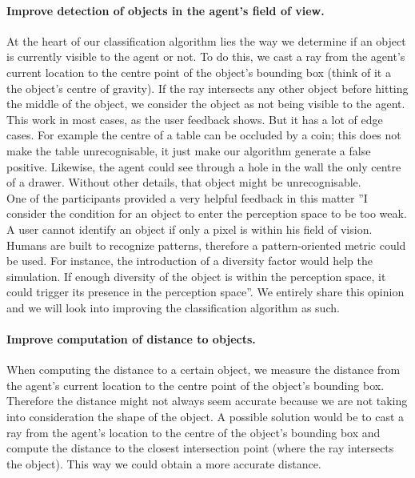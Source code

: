 \paragraph{Improve detection of objects in the agent's field of view.} At the heart of our classification algorithm lies the way we determine if an object is currently visible to the agent or not. To do this, we cast
a ray from the agent's current location to the centre point of the object's bounding box (think of it a the object's centre of gravity). If the ray intersects any other object before hitting the middle of the object,
we consider the object as not being visible to the agent. This work in most cases, as the user feedback shows. But it has a lot of edge cases. For example the centre of a table can be occluded by a coin; this does not make the table unrecognisable, it just make our algorithm generate a false positive. Likewise, the agent could see through a hole in the wall the only centre of a drawer. Without other details, that object
might be unrecognisable.\\

One of the participants provided a very helpful feedback in this matter ''I consider the condition for an object to enter the perception space to be too weak. A user cannot identify an object if only a pixel is within his field of vision. Humans are built to recognize patterns, therefore a pattern-oriented metric could be used. For instance, the introduction of a diversity factor would help the simulation. If enough diversity of the object is within the perception space, it could trigger its presence in the perception space''. We entirely share this opinion and we will look into improving the classification algorithm as such.

\paragraph{Improve computation of distance to objects.} When computing the distance to a certain object, we measure the distance from the agent's current location to the centre point of the object's bounding box. Therefore the distance might not always seem accurate because we are not taking into consideration the shape of the object. A possible solution would be to cast a ray from the agent's location to the centre of the object's bounding box and compute the distance to the closest intersection point (where the ray intersects the object). This way we could obtain a more accurate distance.

